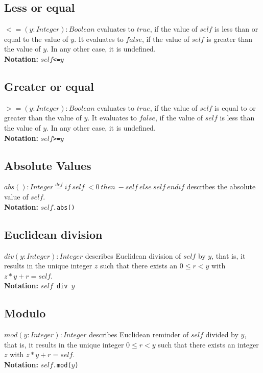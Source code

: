 \subsection{Less or equal}
$<=(y:\mathit{Integer}):\mathit{Boolean}$ evaluates to $\mathit{true}$,
if the
value of
  $\mathit{self}$ is less than or equal to the value of $y$.  It evaluates to
  $\mathit{false}$, if the value of $\mathit{self}$ is greater than the value of $y$.  In
  any other case, it is undefined.\\
  {\bf Notation:} $\mathit{self}$\verb+<=+$y$
\subsection{Greater or equal}
$>=(y:\mathit{Integer}):\mathit{Boolean}$ evaluates to $\mathit{true}$, if the
value of
  $\mathit{self}$ is equal to or greater than the value of $y$.  It evaluates
  to $\mathit{false}$, if the value of $\mathit{self}$ is less than the value of $y$.
  In any other case, it is undefined.\\
  {\bf Notation:} $\mathit{self}$\verb+>=+$y$
\subsection{Absolute Values}
$\mathit{abs}():\mathit{Integer}\stackrel{def}{=}\mathit{if}\ \mathit{self}\ < 0\ \mathit{then}\ -\mathit{self}\
\mathit{else}\
  \mathit{self}\ \mathit{endif}$ describes the absolute value of $\mathit{self}$.\\
  {\bf Notation:} $\mathit{self}$\verb+.abs()+
\subsection{Euclidean division}
$\mathit{div}(y:\mathit{Integer}):\mathit{Integer}$ describes Euclidean division
of
  $\mathit{self}$ by $y$, that is, it results in the unique integer $z$ such
  that there exists an $0\leq r < y$ with $z* y + r=\mathit{self}$.\\
  {\bf Notation:} $\mathit{self}$\verb+ div +$y$
\subsection{Modulo}
$\mathit{mod}(y:\mathit{Integer}):\mathit{Integer}$ describes
Euclidean reminder of
  $\mathit{self}$ divided by $y$, that is, it results in the unique integer
  $0\leq r < y$ such that there exists an integer $z$ with $z* y +
  r=\mathit{self}$.\\
  {\bf Notation:} $\mathit{self}$\verb+.mod(+$y$\verb+)+

